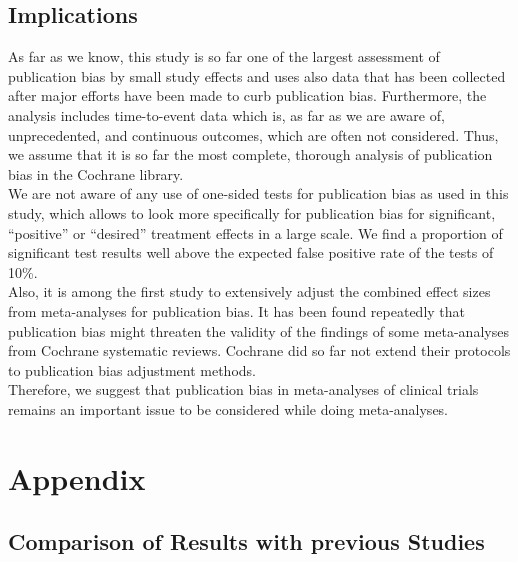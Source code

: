 \documentclass[11pt,a4paper,twoside]{book}\usepackage[]{graphicx}\usepackage[]{color}
\begin{document}
\section{Implications}
As far as we know, this study is so far one of the largest assessment of publication bias by small study effects and uses also data that has been collected after major efforts have been made to curb publication bias. %
Furthermore, the analysis includes time-to-event data which is, as far as we are aware of, unprecedented, and continuous outcomes, which are often not considered. Thus, we assume that it is so far the most complete, thorough analysis of publication bias in the Cochrane library. \\
We are not aware of any use of one-sided tests for publication bias as used in this study, which allows to look more specifically for publication bias for significant, ``positive'' or ``desired'' treatment effects in a large scale. We find a proportion of significant test results well above the expected false positive rate of the tests of 10\%.\\
Also, it is among the first study to extensively adjust the combined effect sizes from meta-analyses for publication bias. It has been found repeatedly that publication bias might threaten the validity of the findings of some meta-analyses from Cochrane systematic reviews. Cochrane did so far not extend their protocols to publication bias adjustment methods.\\
Therefore, we suggest that publication bias in meta-analyses of clinical trials remains an important issue to be considered while doing meta-analyses. 


\appendix




\chapter{Appendix}\label{ch:Appendix}

\section{Comparison of Results with previous Studies}
\end{document}
